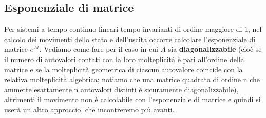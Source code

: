 \subsection{Esponenziale di matrice}
Per sistemi a tempo continuo lineari tempo invarianti di ordine maggiore di $1$, nel calcolo dei movimenti dello stato e dell'uscita occorre calcolare l'esponenziale di matrice $e^{At}$.\newline
\newline
Vediamo come fare per il caso in cui $A$ sia \textbf{diagonalizzabile} (cioè se il numero di autovalori contati con la loro molteplicità è pari all'ordine della matrice e se la molteplicità geometrica di ciascun autovalore coincide con la relativa molteplicità algebrica; notiamo che una matrice quadrata di ordine n che ammette esattamente n autovalori distinti è sicuramente diagonalizzabile), altrimenti il movimento non è calcolabile con l'esponenziale di matrice e quindi si userà un altro approccio, che incontreremo più avanti.

